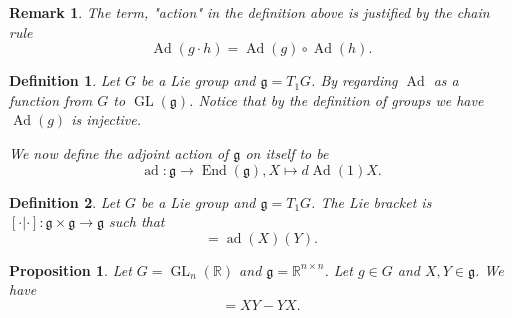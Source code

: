 \documentclass{article}
\newtheorem{proposition}{Proposition}[section]
\newtheorem{definition}{Definition}[section]
\newtheorem{remark}{Remark}[section]
\numberwithin{equation}{section}
\DeclareMathOperator{\Ad}{Ad}
\DeclareMathOperator{\ad}{ad}
\DeclareMathOperator{\End}{End}
\DeclareMathOperator{\GL}{GL}
\begin{document}
\begin{remark}
The term, "action" in the definition above is justified by the chain rule
\begin{equation*}
\Ad(g\cdot h) = \Ad(g)\circ\Ad(h).
\end{equation*}
\end{remark}

\begin{definition}
Let $G$ be a Lie group and $\mathfrak{g}=T_1G$. By regarding $\Ad$ as a function from $G$ to $\GL(\mathfrak{g})$. Notice that by the definition of groups we have $\Ad(g)$ is injective.\\
\par We now define the adjoint action of $\mathfrak{g}$ on itself to be
\begin{equation*}
\ad:\mathfrak{g}\to\End(\mathfrak{g}), X\mapsto d\Ad(1)X.
\end{equation*}
\end{definition}

\begin{definition}
Let $G$ be a Lie group and $\mathfrak{g}=T_1G$. The Lie bracket is $[\cdot|\cdot]:\mathfrak{g}\times\mathfrak{g}\to\mathfrak{g}$ such that 
\begin{equation*}
[X|Y] = \ad(X)(Y).
\end{equation*}
\end{definition}

\begin{proposition}
Let $G=\GL_n(\mathbb{R})$ and $\mathfrak{g}=\mathbb{R}^{n\times n}$. Let $g\in G$ and $X,Y\in\mathfrak{g}$. We have
\begin{equation*}
[X|Y] = XY-YX.
\end{equation*}
\end{proposition}
\end{document}
